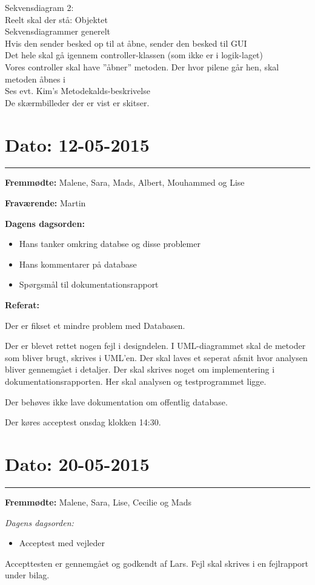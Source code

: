 Sekvensdiagram 2:\\
	Reelt skal der stå: Objektet
\\
Sekvensdiagrammer generelt\\
	Hvis den sender besked op til at åbne, sender den besked til GUI\\
	Det hele skal gå igennem controller-klassen (som ikke er i logik-laget)
\\

Vores controller skal have ”åbner” metoden.
Der hvor pilene går hen, skal metoden åbnes i\\
Ses evt. Kim’s Metodekalds-beskrivelse
\\

De skærmbilleder der er vist er skitser.


\section{Dato: 12-05-2015}
\hrule


\textbf{Fremmødte:} Malene, Sara, Mads, Albert, Mouhammed og Lise 

\textbf{Fraværende:} Martin

\textbf{Dagens dagsorden:}
\begin{itemize}
	\item Hans tanker omkring databse og disse problemer
	\item Hans kommentarer på database
	\item Spørgsmål til dokumentationsrapport
\end{itemize}

\textbf{Referat:}

Der er fikset et mindre problem med Databasen. 

Der er blevet rettet nogen fejl i designdelen. I UML-diagrammet skal de metoder som bliver brugt, skrives i UML'en. Der skal laves et seperat afsnit hvor analysen bliver gennemgået i detaljer. Der skal skrives noget om implementering i dokumentationsrapporten. Her skal analysen og testprogrammet ligge. 

Der behøves ikke lave dokumentation om offentlig database. 

Der køres acceptest onsdag klokken 14:30. 

\section{Dato: 20-05-2015}
\hrule

\textbf{Fremmødte: } Malene, Sara, Lise, Cecilie og Mads

\textit{Dagens dagsorden:}
\begin{itemize}
	\item Acceptest med vejleder
\end{itemize}
Accepttesten er gennemgået og godkendt af Lars.
Fejl skal skrives i en fejlrapport under bilag.

 



